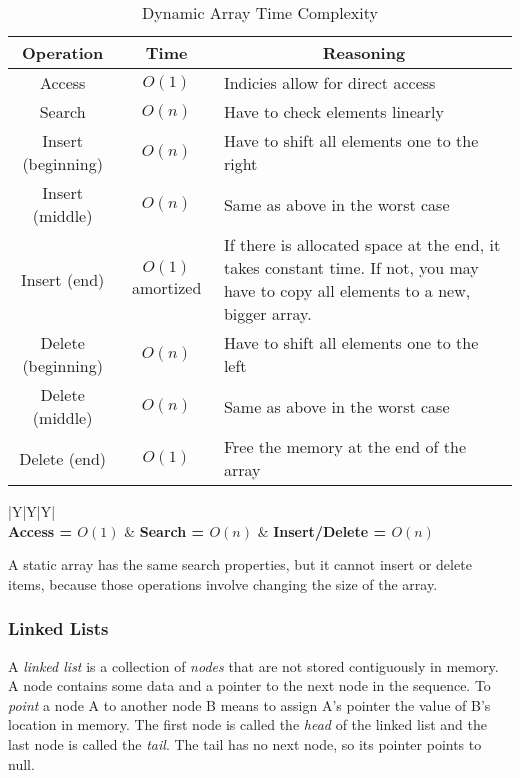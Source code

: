 \begin{table}[H]
	\caption{Dynamic Array Time Complexity}
	\label{tab:array}
	\begin{tabularx}{\textwidth}{|c|c|X|}
		\vtabularspace{3}
		\hline
		Operation & Time & \multicolumn{1}{c|}{Reasoning} \\
		\hline
		Access & $O(1)$ & Indicies allow for direct access \\
		Search & $O(n)$ & Have to check elements linearly \\
		\hline
		\hline
		Insert (beginning) & $O(n)$ & Have to shift all elements one to the right \\
		Insert (middle) & $O(n)$ & Same as above in the worst case \\
		Insert (end) & $O(1)$ amortized & If there is allocated space at the end, it takes constant time. If not, you may have to copy all elements to a new, bigger array.\\
		\hline
		\hline
		Delete (beginning) & $O(n)$ & Have to shift all elements one to the left \\
		Delete (middle) & $O(n)$ & Same as above in the worst case \\
		Delete (end) & $O(1)$ & Free the memory at the end of the array \\
		\hline
	\end{tabularx}
	\begin{tabularx}{\textwidth}{|Y|Y|Y|}
	\hline
	 \\
	\hline
	\textbf{Access = $O(1)$} & \textbf{Search = $O(n)$} & \textbf{Insert/Delete = $O(n)$} \\
	\hline
	\end{tabularx}
\end{table}

A static array has the same search properties, but it cannot insert or delete items, because those operations involve changing the size of the array.

\subsubsection{Linked Lists}

A \textit{linked list} is a collection of \textit{nodes} that are not stored contiguously in memory. A node contains some data and a pointer to the next node in the sequence. To \textit{point} a node A to another node B means to assign A's pointer the value of B's location in memory. The first node is called the \textit{head} of the linked list and the last node is called the \textit{tail}. The tail has no next node, so its pointer points to null.\\

